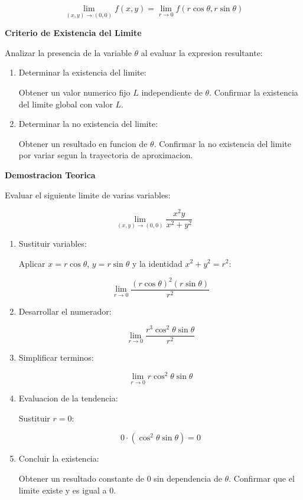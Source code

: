 \documentclass{article}
\begin{document}
\begin{justfy}
\[\lim_{(x,y)\to(0,0)}f(x,y)=\lim_{r\to0}f(r\cos\theta,r\sin\theta)\]

\newpage

\small \textbf {Criterio de Existencia del Limite}

Analizar la presencia de la variable $\theta$ al evaluar la expresion
resultante:

\begin{enumerate}
\item Determinar la existencia del limite:

\small {Obtener un valor numerico fijo $L$ independiente de $\theta$. Confirmar la existencia del limite global con valor $L$.}

\item Determinar la no existencia del limite:

\small {Obtener un resultado en funcion de $\theta$. Confirmar la no
existencia del limite por variar segun la trayectoria de aproximacion.}
\end{enumerate}

\vspace{0.1cm}
\small \textbf {Demostracion Teorica}

\small {Evaluar el siguiente limite de varias variables:}

\[\lim_{(x,y)\to(0,0)}\frac{x^2y}{x^2+y^2}\]

\begin{enumerate}
\item Sustituir variables:

\small {Aplicar $x=r\cos\theta$, $y=r\sin\theta$ y la identidad
$x^2+y^2=r^2$:}

\[\lim_{r\to 0}\frac{(r\cos\theta)^2(r\sin\theta)}{r^2}\]

\item Desarrollar el numerador:

\[\lim_{r\to 0}\frac{r^3\cos^2\theta\sin\theta}{r^2}\]

\item Simplificar terminos:

\[\lim_{r\to 0}r\cos^2\theta\sin\theta\]

\item Evaluacion de la tendencia:

\small {Sustituir $r=0$:}

\[0\cdot(\cos^2\theta\sin\theta)=0\]

\item Concluir la existencia:

\small {Obtener un resultado constante de $0$ sin dependencia de
$\theta$. Confirmar que el limite existe y es igual a $0$.}
\end{enumerate}


\end{justfy}
\end{document}
